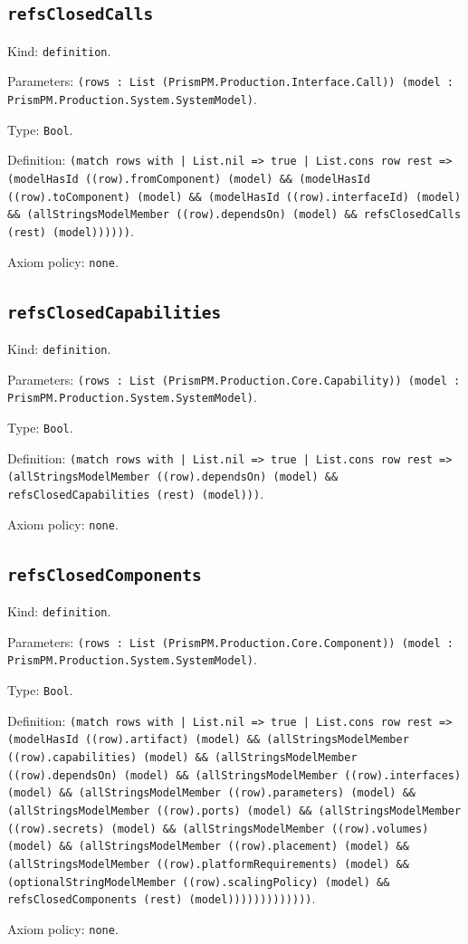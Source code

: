 \documentclass[11pt]{article}
\begin{document}
\subsection*{\texttt{refsClosedCalls}}
\noindent Kind: \texttt{definition}.\par
\noindent Parameters: \texttt{(rows : List (PrismPM.Production.Interface.Call)) (model : PrismPM.Production.System.SystemModel)}.\par
\noindent Type: \texttt{Bool}.\par
\noindent Definition: \texttt{(match rows with | List.nil => true | List.cons row rest => (modelHasId ((row).fromComponent) (model) \&\& (modelHasId ((row).toComponent) (model) \&\& (modelHasId ((row).interfaceId) (model) \&\& (allStringsModelMember ((row).dependsOn) (model) \&\& refsClosedCalls (rest) (model))))))}.\par
\noindent Axiom policy: \texttt{none}.\par
\subsection*{\texttt{refsClosedCapabilities}}
\noindent Kind: \texttt{definition}.\par
\noindent Parameters: \texttt{(rows : List (PrismPM.Production.Core.Capability)) (model : PrismPM.Production.System.SystemModel)}.\par
\noindent Type: \texttt{Bool}.\par
\noindent Definition: \texttt{(match rows with | List.nil => true | List.cons row rest => (allStringsModelMember ((row).dependsOn) (model) \&\& refsClosedCapabilities (rest) (model)))}.\par
\noindent Axiom policy: \texttt{none}.\par
\subsection*{\texttt{refsClosedComponents}}
\noindent Kind: \texttt{definition}.\par
\noindent Parameters: \texttt{(rows : List (PrismPM.Production.Core.Component)) (model : PrismPM.Production.System.SystemModel)}.\par
\noindent Type: \texttt{Bool}.\par
\noindent Definition: \texttt{(match rows with | List.nil => true | List.cons row rest => (modelHasId ((row).artifact) (model) \&\& (allStringsModelMember ((row).capabilities) (model) \&\& (allStringsModelMember ((row).dependsOn) (model) \&\& (allStringsModelMember ((row).interfaces) (model) \&\& (allStringsModelMember ((row).parameters) (model) \&\& (allStringsModelMember ((row).ports) (model) \&\& (allStringsModelMember ((row).secrets) (model) \&\& (allStringsModelMember ((row).volumes) (model) \&\& (allStringsModelMember ((row).placement) (model) \&\& (allStringsModelMember ((row).platformRequirements) (model) \&\& (optionalStringModelMember ((row).scalingPolicy) (model) \&\& refsClosedComponents (rest) (model)))))))))))))}.\par
\noindent Axiom policy: \texttt{none}.\par
\end{document}
